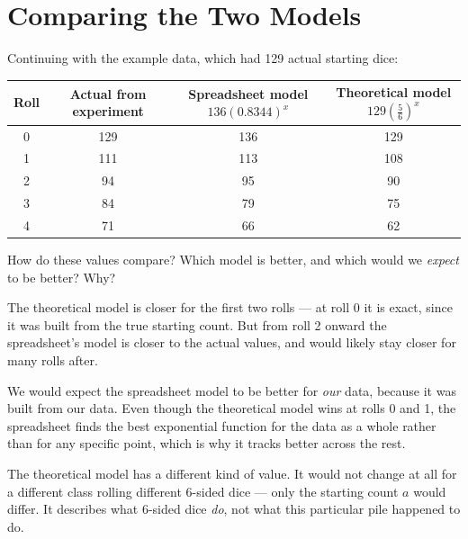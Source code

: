\documentclass[12pt]{ximera}
\begin{document}
\section*{Comparing the Two Models}

Continuing with the example data, which had 129 actual starting dice:

\begin{center}
\begin{tabular}{cccc}
\hline
Roll & Actual from experiment & Spreadsheet model $136(0.8344)^x$ & Theoretical model $129\left(\tfrac{5}{6}\right)^x$ \\
\hline
0 & 129 & 136 & 129 \\
1 & 111 & 113 & 108 \\
2 & 94  & 95  & 90  \\
3 & 84  & 79  & 75  \\
4 & 71  & 66  & 62  \\
\hline
\end{tabular}
\end{center}

\begin{problem}
How do these values compare? Which model is better, and which would we \emph{expect} to be
better? Why?

\begin{freeResponse}
\end{freeResponse}

\begin{solution}
The theoretical model is closer for the first two rolls --- at roll 0 it is exact, since it
was built from the true starting count. But from roll 2 onward the spreadsheet's model is
closer to the actual values, and would likely stay closer for many rolls after.

We would expect the spreadsheet model to be better for \emph{our} data, because it was
built from our data. Even though the theoretical model wins at rolls 0 and 1, the
spreadsheet finds the best exponential function for the data as a whole rather than for
any specific point, which is why it tracks better across the rest.

The theoretical model has a different kind of value. It would not change at all for a
different class rolling different 6-sided dice --- only the starting count $a$ would
differ. It describes what 6-sided dice \emph{do}, not what this particular pile happened
to do.
\end{solution}
\end{problem}
\end{document}
